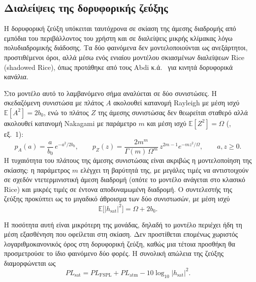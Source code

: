 \subsection{Διαλείψεις της δορυφορικής ζεύξης}
\label{subsec:meth-sat-fading}

Η δορυφορική ζεύξη υπόκειται ταυτόχρονα σε σκίαση της άμεσης διαδρομής
από εμπόδια του περιβάλλοντος του χρήστη και σε διαλείψεις μικρής
κλίμακας λόγω πολυδιαδρομικής διάδοσης. Τα δύο φαινόμενα δεν
μοντελοποιούνται ως ανεξάρτητοι, προστιθέμενοι όροι, αλλά μέσω ενός
ενιαίου μοντέλου σκιασμένων διαλείψεων Rice (shadowed Rice), όπως
προτάθηκε από τους Abdi κ.ά.~\cite{abdi2003lms} για κινητά δορυφορικά
κανάλια.

Στο μοντέλο αυτό το λαμβανόμενο σήμα αναλύεται σε δύο συνιστώσες. Η
σκεδαζόμενη συνιστώσα με πλάτος $A$ ακολουθεί κατανομή Rayleigh με μέση
ισχύ $\mathbb{E}[A^2] = 2b_0$, ενώ το πλάτος $Z$ της άμεσης συνιστώσας δεν
θεωρείται σταθερό αλλά ακολουθεί κατανομή Nakagami με παράμετρο $m$ και
μέση ισχύ $\mathbb{E}[Z^2] = \Omega$ (\cite{abdi2003lms}, εξ.~1):
\begin{equation}
p_A(a) = \frac{a}{b_0}\,e^{-a^{2}/2b_0}, \qquad
p_Z(z) = \frac{2m^{m}}{\Gamma(m)\,\Omega^{m}}\, z^{2m-1}
         e^{-m z^{2}/\Omega}, \qquad a,z \ge 0.
\label{eq:shadowed-rice-components}
\end{equation}
Η τυχαιότητα του πλάτους της άμεσης συνιστώσας είναι ακριβώς η
μοντελοποίηση της σκίασης: η παράμετρος $m$ ελέγχει τη βαρύτητά της, με
μεγάλες τιμές να αντιστοιχούν σε σχεδόν ντετερμινιστική άμεση διαδρομή
(οπότε το μοντέλο ανάγεται στο κλασικό Rice) και μικρές τιμές σε έντονα
αποδυναμωμένη διαδρομή. Ο συντελεστής της ζεύξης προκύπτει ως το μιγαδικό
άθροισμα των δύο συνιστωσών, με μέση ισχύ
\begin{equation}
\mathbb{E}\big[|h_{\text{sat}}|^{2}\big] = \Omega + 2b_0 .
\label{eq:shadowed-rice-power}
\end{equation}

Η ποσότητα αυτή είναι μικρότερη της μονάδας, δηλαδή το μοντέλο περιέχει
ήδη τη μέση εξασθένηση που οφείλεται στη σκίαση. Δεν προστίθεται επομένως
χωριστός λογαριθμοκανονικός όρος στη δορυφορική ζεύξη, καθώς μια τέτοια
προσθήκη θα προσμετρούσε το ίδιο φαινόμενο δύο φορές. Η συνολική απώλεια
της ζεύξης διαμορφώνεται ως
\begin{equation}
PL_{\text{sat}} = PL_{\text{FSPL}} + PL_{\text{atm}}
- 10\log_{10}\big|h_{\text{sat}}\big|^{2}.
\label{eq:sat-fading}
\end{equation}

